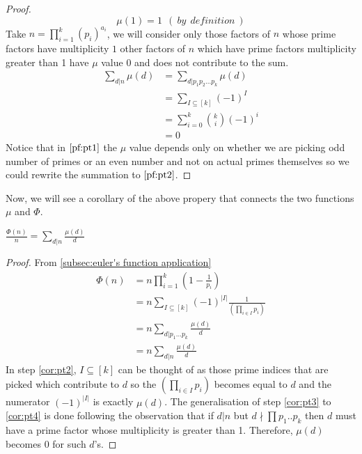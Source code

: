\begin{proof}

$$\mu(1) = 1 ~~(~by~ ~definition~)$$
Take $n= \prod_{i=1}^{k}(p_i)^{a_i}$, we will consider only those factors of $n$ whose prime factors have multiplicity $1$ other factors of $n$ which have prime factors multiplicity greater than 1 have $\mu$ value $0$ and does not contribute to the sum.     
\begin{align}
\sum_{d|n}\mu(d) &= \sum_{d|p_1p_2...p_k}\mu(d) \label{pf:pt1} \\
&= \sum_{I\subseteq[k]}{(-1)}^I \label{pf:pt2} \\ 
&= \sum_{i=0}^{k} {k \choose i}{(-1)}^i\nonumber\\
&= 0 \nonumber
\end{align}
Notice that in $\ref{pf:pt1}$ the $\mu$ value depends only on whether we are picking odd number of primes or an even number and not on actual primes themselves so we could rewrite the summation to
$\ref{pf:pt2}$.
\end{proof}
\noindent
Now, we will see a corollary of the above propery that connects the two functions $\mu$ and $\Phi$. \\ 
\begin{corollary} \label{subsec:relation between euler function and mobius function}
$\frac{\Phi(n)}{n} = \sum_{d|n}\frac{\mu(d)}{d} $
\begin{proof}
From \ref{subsec:euler's function application}
\begin{align}
    \Phi(n) &= n\prod_{i=1}^{k}(1-\frac{1}{p_i}) \label{cor:pt1}\\
    &= n\sum_{I \subseteq [k]} (-1)^{|I|}\frac{1}{(\prod_{i \in I}p_i)}\label{cor:pt2}\\
    &= n\sum_{d|p_1...p_k}\frac{\mu(d)}{d} \label{cor:pt3} \\
    &= n\sum_{d|n}\frac{\mu(d)}{d} \label{cor:pt4}
\end{align}
In step \ref{cor:pt2}, $I\subseteq[k]$ can be thought of as those prime indices that are picked which contribute to $d$ so the ${(\prod_{i \in I}p_i)}$ becomes equal to $d$  and the numerator $(-1)^{|I|}$ is exactly $\mu(d)$. The generalisation of step \ref{cor:pt3} to \ref{cor:pt4} is done following the observation that if $d|n$ but $d\nmid\prod p_1..p_k$  then $d$ must have a prime factor whose multiplicity is greater than 1. Therefore, $\mu(d)$ becomes $0$ for such $d$'s.
\end{proof}
\end{corollary}

